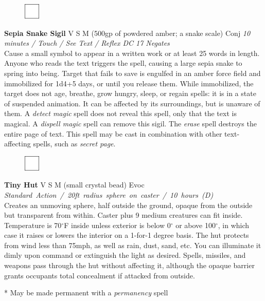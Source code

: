 \documentclass[letterpaper]{article}
\newcommand{\spell}[7]{
\begin{figure}
\vspace{-13pt}
\ifstrequal{#2}{Full}{\includegraphics[width=2em]{Checkbox-Full}}{
                      \includegraphics[width=2em]{Checkbox}}
\ifstrequal{#7}{}{\vspace{-1em}}{\vspace{#7}}
\end{figure}
\noindent \textbf{#1} #3 {
    \ifstrequal{#4}{Conj}{\color{Plum}Conj}{%
    \ifstrequal{#4}{Divin}{\color{YellowOrange}Divin}{%
    \ifstrequal{#4}{Ench}{\color{VioletRed}Ench}{%
    \ifstrequal{#4}{Trans}{\color{LimeGreen}Trans}{%
    \ifstrequal{#4}{Evoc}{\color{RedOrange}Evoc}{%
    \ifstrequal{#4}{Illu}{\color{ProcessBlue}Illu}{%
    \ifstrequal{#4}{Abjur}{\color{CadetBlue}Abjur}{%
    \ifstrequal{#4}{Necro}{\color{Red}Necro}{%
}}}}}}}}}
{\footnotesize \emph{#5}} \\
#6
}
\begin{document}
\spell{Sepia Snake Sigil}{}{V S M (500gp of powdered amber; a snake scale)}{Conj}{\emph{10 minutes / Touch / See Text / Reflex DC 17 Negates}}{%
Cause a small symbol to appear in a written work or at least 25 words in length.  Anyone who reads the text triggers the spell, causing a large sepia snake to spring into being.  Target that fails to save is engulfed in an amber force field and immobilized for 1d4+5 days, or until you release them.  While immobilized, the target does not age, breathe, grow hungry, sleep, or regain spells: it is in a state of suspended animation.  It can be affected by its surroundings, but is unaware of them.  A \emph{detect magic} spell does not reveal this spell, only that the text is magical.  A \emph{dispell magic} spell can remove this sigil.  The \emph{erase} spell destroys the entire page of text.  This spell may be cast in combination with other text-affecting spells, such as \emph{secret page}.}{5em}\\[-1em] %

\spell{Tiny Hut}{}{V S M (small crystal bead)}{Evoc}{\mbox{Standard Action / 20ft radius sphere on caster /  10 hours (D)}}{%
Creates an unmoving sphere, half outside the ground, opaque from the outside but transparent from within.  Caster plus 9 medium creatures can fit inside.  Temperature is 70$^{\circ}$F inside unless exterior is below 0$^{\circ}$ or above 100$^{\circ}$, in which case it raises or lowers the interior on a 1-for-1 degree basis.  The hut protects from wind less than 75mph, as well as rain, dust, sand, etc.  You can illuminate it dimly upon command or extinguish the light as desired.  Spells, missiles, and weapons pass through the hut without affecting it, although the opaque barrier grants occupants total concealment if attacked from outside.}{2em} %

\noindent** May be made permanent with a \emph{permanency} spell

\pagebreak
\end{document}
